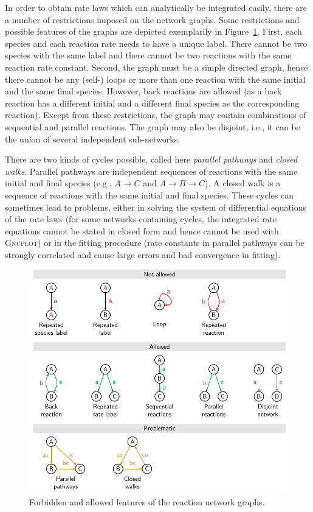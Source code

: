 \documentclass[a4paper,11pt,DIV=15,openany,twoside=false]{scrbook}
\begin{document}
In order to obtain rate laws which can analytically be integrated easily, there are a number of restrictions imposed on the network graphs.
Some restrictions and possible features of the graphs are depicted exemplarily in Figure~\ref{fig:graph_restrictions}.
First, each species and each reaction rate needs to have a unique label. 
There cannot be two species with the same label and there cannot be two reactions with the same reaction rate constant.
Second, the graph must be a simple directed graph, hence there cannot be any (self-) loops or more than one reaction with the same initial and the same final species.
However, back reactions are allowed (as a back reaction has a different initial and a different final species as the corresponding reaction).
Except from these restrictions, the graph may contain combinations of sequential and parallel reactions.
The graph may also be disjoint, i.e., it can be the union of several independent sub-networks.

There are two kinds of cycles possible, called here \textit{parallel pathways} and \textit{closed walks}.
Parallel pathways are independent sequences of reactions with the same initial and final species (e.g., $A\rightarrow C$ and $A\rightarrow B\rightarrow C$).
A closed walk is a  sequence of reactions with the same initial and final species.
These cycles can sometimes lead to problems, either in solving the system of differential equations of the rate laws (for some networks containing cycles, the integrated rate equations cannot be stated in closed form and hence cannot be used with \textsc{Gnuplot}) or in the fitting procedure (rate constants in parallel pathways can be strongly correlated and cause large errors and bad convergence in fitting).

\begin{figure}[h!]
  \centering
  \includegraphics[scale=1]{img/reaction_networks/allowed_notallowed.pdf}
  \caption{Forbidden and allowed features of the reaction network graphs.}
  \label{fig:graph_restrictions}
\end{figure}
\end{document}

